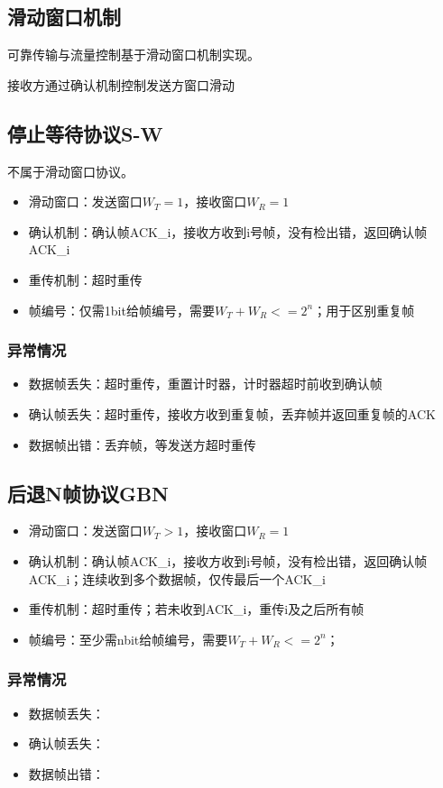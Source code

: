 \subsection{滑动窗口机制}
可靠传输与流量控制基于滑动窗口机制实现。

接收方通过确认机制控制发送方窗口滑动


\subsection{停止等待协议S-W}
不属于滑动窗口协议。
\begin{itemize}
    \item 滑动窗口：发送窗口\(W_T = 1\)，接收窗口\(W_R = 1\)
    \item 确认机制：确认帧ACK\_i，接收方收到i号帧，没有检出错，返回确认帧ACK\_i
    \item 重传机制：超时重传
    \item 帧编号：仅需1bit给帧编号，需要\(W_T + W_R <= 2^n\)；用于区别重复帧
\end{itemize}

\subsubsection{异常情况}
\begin{itemize}
    \item 数据帧丢失：超时重传，重置计时器，计时器超时前收到确认帧
    \item 确认帧丢失：超时重传，接收方收到重复帧，丢弃帧并返回重复帧的ACK
    \item 数据帧出错：丢弃帧，等发送方超时重传
\end{itemize}


\subsection{后退N帧协议GBN}
\begin{itemize}
    \item 滑动窗口：发送窗口\(W_T > 1\)，接收窗口\(W_R = 1\)
    \item 确认机制：确认帧ACK\_i，接收方收到i号帧，没有检出错，返回确认帧ACK\_i；连续收到多个数据帧，仅传最后一个ACK\_i
    \item 重传机制：超时重传；若未收到ACK\_i，重传i及之后所有帧
    \item 帧编号：至少需nbit给帧编号，需要\(W_T + W_R <= 2^n\)；
\end{itemize}

\subsubsection{异常情况}
\begin{itemize}
    \item 数据帧丢失：
    \item 确认帧丢失：
    \item 数据帧出错：
\end{itemize}


